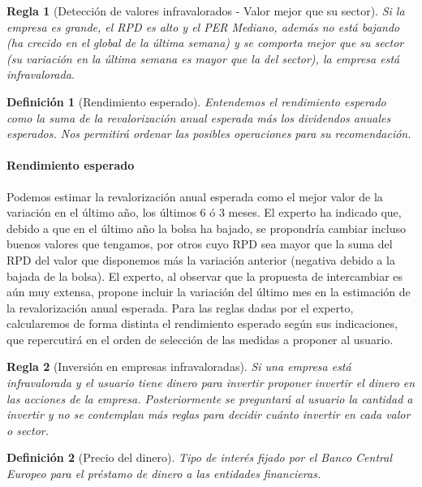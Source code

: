 \documentclass[11pt,leqno]{article}
\theoremstyle{definition_wo_parentheses}
\newtheorem{definicion}{Definición}[subsection]
\theoremstyle{plain}
\newtheorem{regla}{Regla}[subsection]
\theoremstyle{remark}
\begin{document}
\begin{regla}[Detección de valores infravalorados - Valor mejor que su sector]
	Si la empresa es grande, el RPD es alto y el PER Mediano, además no está bajando (ha crecido en el global de la última semana) y se comporta mejor que su sector (su variación en la última semana es mayor que la del sector), la empresa está infravalorada.
\end{regla}	

\begin{definicion}[Rendimiento esperado]
	Entendemos el rendimiento esperado como la suma de la revalorización anual esperada más los dividendos anuales esperados. Nos permitirá ordenar las posibles operaciones para su recomendación. 
\end{definicion}

\paragraph{Rendimiento esperado} Podemos estimar la revalorización anual esperada como el mejor valor de la variación en el último año, los últimos 6 ó 3 meses. El experto ha indicado que, debido a que en el último año la bolsa ha bajado, se propondría cambiar incluso buenos valores que tengamos, por otros cuyo RPD sea mayor que la suma del RPD del valor que disponemos más la variación anterior (negativa debido a la bajada de la bolsa). El experto, al observar que la propuesta de intercambiar es aún muy extensa, propone incluir la variación del último mes en la estimación de la revalorización anual esperada. Para las reglas dadas por el experto, calcularemos de forma distinta el rendimiento esperado según sus indicaciones, que repercutirá en el orden de selección de las medidas a proponer al usuario.

\begin{regla}[Inversión en empresas infravaloradas]
	 Si una empresa está infravalorada y el usuario tiene  dinero para invertir proponer invertir el dinero en las acciones de la empresa. Posteriormente se preguntará al usuario la cantidad a invertir y no se contemplan más reglas para decidir cuánto invertir en cada valor o sector.
\end{regla}	
	
\begin{definicion}[Precio del dinero]
	Tipo de interés fijado por el Banco Central Europeo para el préstamo de dinero a las entidades financieras. 
\end{definicion}
\end{document}
